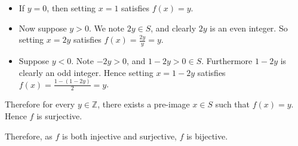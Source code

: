 \begin{enumerate}
\begin{itemize}
\begin{itemize}
            \item If $y = 0$, then setting $x = 1$ satisfies $f(x) = y$.
            \item Now suppose $y > 0$. We note $2y \in S$, and clearly $2y$ is an even integer. So setting $x = 2y$ satisfies $f(x) = \frac{2y}{y} = y$.
            \item Suppose $y < 0$. Note $-2y > 0$, and $1 - 2y > 0 \in S$. Furthermore $1 - 2y$ is clearly an odd integer. Hence setting $x = 1 - 2y$ satisfies $f(x) = \frac{1-(1-2y)}{2} = y$.
        \end{itemize}
        Therefore for every $y \in \mathbb{Z}$, there exists a pre-image $x \in S$ such that $f(x) = y$. Hence $f$ is surjective.
    \end{itemize}
    Therefore, as $f$ is both injective and surjective, $f$ is bijective.
\end{enumerate}


